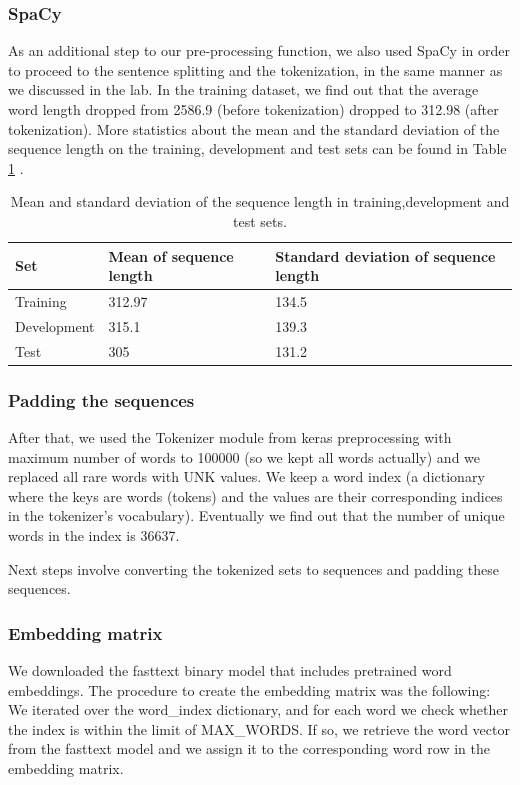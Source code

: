\documentclass[10pt, a4paper]{article}
\begin{document}
	
	\subsubsection{SpaCy}
	As an additional step to our pre-processing function, we also used SpaCy in order to proceed to the sentence splitting and the tokenization, in the same manner as we discussed in the lab. In the training dataset, we find out that the average word length dropped from 2586.9 (before tokenization) dropped to 312.98 (after tokenization). More statistics about the mean and the standard deviation of the sequence length on the training, development and test sets can be found in Table \ref{tab::ex-1-stats} .

 	\begin{table}
		\begin{tabular}{|l|l|l|}
			\hline
			\cellcolor{blue!25}\textbf{Set} & \cellcolor{blue!25}\textbf{Mean of sequence length} &
			\cellcolor{blue!25}\textbf{Standard deviation of sequence length}\\
			\hline
			Training & 312.97 & 134.5 \\\hline
			Development & 315.1  & 139.3 \\\hline
			Test & 305 & 131.2 \\\hline
		\end{tabular}
		\centering
		\caption{Mean and standard deviation of the sequence length in training,development and test sets.}
		\label{tab::ex-1-stats}
	\end{table}
	
	
	
	\subsubsection{Padding the sequences}
	After that, we used the Tokenizer module from keras preprocessing with maximum number of words to 100000 (so we kept all words actually) and we replaced all rare words with UNK values. We keep a word index (a dictionary where the keys are words (tokens) and the values are their corresponding indices in the tokenizer's vocabulary). Eventually we find out that the number of unique words in the index is 36637.
 
    Next steps involve converting the tokenized sets to sequences and padding these sequences.

    \subsubsection{Embedding matrix}
     We downloaded the fasttext binary model that includes pretrained word embeddings. The procedure to create the embedding matrix was the following: We iterated over the word\_index dictionary, and for each word we check whether the index is within the limit of MAX\_WORDS. If so, we retrieve the word vector from the fasttext model and we assign it to the corresponding word row in the embedding matrix.
    
\end{document}
